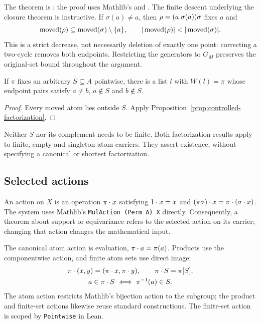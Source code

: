 The theorem is ; the proof uses Mathlib's
 and .
The finite descent underlying the closure theorem is instructive. If
$\sigma(a)\ne a$, then $\rho=(a\;\sigma(a))\sigma$ fixes $a$ and
\[
  \moved(\rho)\subseteq\moved(\sigma)\setminus\{a\},\qquad
  |\moved(\rho)|<|\moved(\sigma)|.
\]
This is a strict decrease, not necessarily deletion of exactly one point:
correcting a two-cycle removes both endpoints. Restricting the generators
to $G_M$ preserves the original-set bound throughout the argument.

\begin{proposition}
\label{prop:avoidance-factorization}
If $\pi$ fixes an arbitrary $S\subseteq A$ pointwise, there is a list
$l$ with $W(l)=\pi$ whose endpoint pairs satisfy
$a\ne b$, $a\notin S$ and $b\notin S$.
\end{proposition}

\begin{proof}
Every moved atom lies outside $S$. Apply
Proposition~\ref{prop:controlled-factorization}.
\end{proof}

Neither $S$ nor its complement needs to be finite. Both factorization
results apply to finite, empty and singleton atom carriers. They assert
existence, without specifying a canonical or shortest factorization.

\subsection{Selected actions}
\label{sec:actions}

An action on $X$ is an operation $\pi\mathbin{\cdot} x$ satisfying
$1\mathbin{\cdot} x=x$ and $(\pi\sigma)\mathbin{\cdot} x=\pi\mathbin{\cdot}(\sigma\mathbin{\cdot} x)$.
The system uses Mathlib's \texttt{MulAction (Perm A) X} directly.
Consequently, a theorem about support or equivariance refers to the selected
action on its carrier; changing that action changes the mathematical input.

The canonical atom action is evaluation, $\pi\mathbin{\cdot} a=\pi(a)$.
Products use the componentwise action, and finite atom sets use direct image:
\begin{gather*}
  \pi\mathbin{\cdot}(x,y)=(\pi\mathbin{\cdot} x,\pi\mathbin{\cdot} y),\qquad \pi\mathbin{\cdot} S=\pi[S],\\
  a\in\pi\mathbin{\cdot} S\ \Longleftrightarrow\ \pi^{-1}(a)\in S.
\end{gather*}
The atom action restricts Mathlib's bijection action to the subgroup;
the product and finite-set actions likewise reuse standard constructions.
The finite-set action is scoped by \texttt{Pointwise} in Lean.

